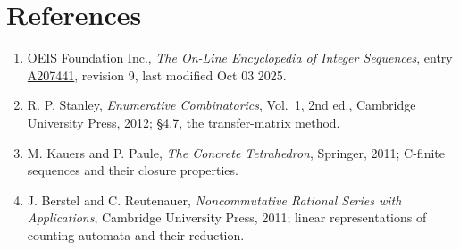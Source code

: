 \documentclass[11pt]{article}
\theoremstyle{definition}
\begin{document}
\section{References}

\begin{enumerate}

\item OEIS Foundation Inc., \emph{The On-Line Encyclopedia of Integer Sequences}, entry \href{https://oeis.org/A207441}{A207441}, revision 9, last modified Oct 03 2025.

\item R. P. Stanley, \emph{Enumerative Combinatorics}, Vol.~1, 2nd ed., Cambridge University Press, 2012; \S4.7, the transfer-matrix method.

\item M. Kauers and P. Paule, \emph{The Concrete Tetrahedron}, Springer, 2011; C-finite sequences and their closure properties.

\item J. Berstel and C. Reutenauer, \emph{Noncommutative Rational Series with Applications}, Cambridge University Press, 2011; linear representations of counting automata and their reduction.

\end{enumerate}
\end{document}

